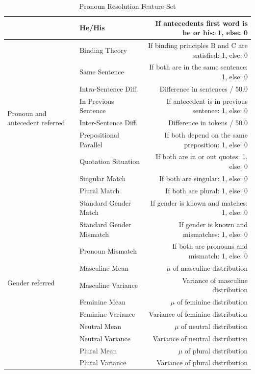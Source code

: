 \begin{table}[p]
\begin{tabular}{| l | l | r |}
	& He/His & If antecedents first word is he or his: 1, else: 0 \\  \hline
	\hline
	\multirow{9}{1.3cm}{Pronoun and antecedent referred} & Binding Theory & If binding principles B and C are satisfied: 1, else: 0 \\ \cline{2-3}
 	& Same Sentence &  If both are in the same sentence: 1, else: 0 \\	\cline{2-3}
	& Intra-Sentence Diff. &  Difference in sentences / 50.0 \\	\cline{2-3}
	& In Previous Sentence & If antecedent is in previous sentence: 1, else: 0 \\ \cline{2-3}
	& Inter-Sentence Diff. & Difference in tokens / 50.0\\ \cline{2-3}
	& Prepositional Parallel & If both depend on the same preposition: 1, else: 0 \\ \cline{2-3}
	& Quotation Situation & If both are in or out quotes: 1, else: 0 \\ \cline{2-3}
	& Singular Match & If both are singular: 1, else: 0 \\ \cline{2-3}
	& Plural Match & If both are plural: 1, else: 0 \\ \hline
	\hline
	\multirow{11}{1.3cm}{Gender referred} & Standard Gender Match & If gender is known and matches: 1, else: 0 \\ \cline{2-3}
 	& Standard Gender Mismatch &  If gender is known and mismatches: 1, else: 0 \\	\cline{2-3}
	& Pronoun Mismatch &  If both are pronouns and mismatch: 1, else: 0 \\	\cline{2-3}
	& Masculine Mean & $\mu$ of masculine distribution \\ \cline{2-3}
	& Masculine Variance & Variance of masculine distribution \\ \cline{2-3}
	& Feminine Mean & $\mu$ of feminine distribution \\ \cline{2-3}
	& Feminine Variance & Variance of feminine distribution \\ \cline{2-3}
	& Neutral Mean & $\mu$ of neutral distribution \\ \cline{2-3}
	& Neutral Variance & Variance of neutral distribution \\ \cline{2-3}
	& Plural Mean & $\mu$ of plural distribution \\ \cline{2-3}
	& Plural Variance & Variance of plural distribution \\ \hline

  \end{tabular}
  \caption{Pronoun Resolution Feature Set}
\end{table}

